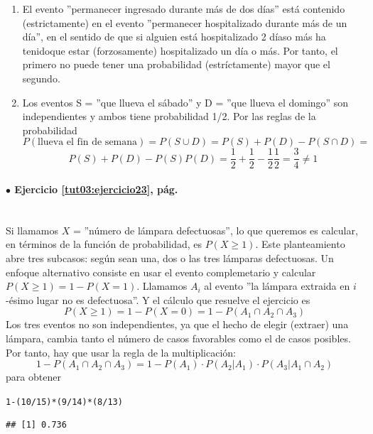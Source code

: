 \documentclass[10pt,a4paper]{article}\usepackage[]{graphicx}\usepackage[]{color}
\makeatletter
\newcommand{\hlnum}[1]{\textcolor[rgb]{0.686,0.059,0.569}{#1}}%
\newcommand{\hlopt}[1]{\textcolor[rgb]{0,0,0}{#1}}%
\newcommand{\hlstd}[1]{\textcolor[rgb]{0.345,0.345,0.345}{#1}}%
\newenvironment{kframe}{%
 \def\at@end@of@kframe{}%
 \ifinner\ifhmode%
  \def\at@end@of@kframe{\end{minipage}}%
  \begin{minipage}{\columnwidth}%
 \fi\fi%
 \def\FrameCommand##1{\hskip\@totalleftmargin \hskip-\fboxsep
 \colorbox{shadecolor}{##1}\hskip-\fboxsep
     \hskip-\linewidth \hskip-\@totalleftmargin \hskip\columnwidth}%
 \MakeFramed {\advance\hsize-\width
   \@totalleftmargin\z@ \linewidth\hsize
   \@setminipage}}%
 {\par\unskip\endMakeFramed%
 \at@end@of@kframe}
\newenvironment{knitrout}{}{} %
\newcounter {cont01}
\makeatother
\begin{document}
\begin{enumerate}
\item El evento ''permanecer ingresado durante m\'as de dos d\'ias'' está contenido (estrictamente) en el evento ''permanecer  hospitalizado durante m\'as de un d\'ia'', en el sentido de que si alguien está hospitalizado 2 díaso más ha tenidoque estar (forzosamente) hospitalizado un día o más. Por tanto, el primero no puede tener una probabilidad (estríctamente) mayor que el segundo.
\item Los eventos S = ''que llueva el sábado'' y  D = ''que llueva el domingo'' son independientes y ambos tiene probabilidad 1/2. 
Por las reglas de la probabilidad 
$$P(\text{llueva el fin de semana})=P(S\cup D) =P(S)+P( D)-P(S\cap D) =$$ 
$$ P(S)+P( D)-P(S)P(D) = \frac{1}{2}+\frac{1}{2}-\frac{1}{2}\frac{1}{2}=\frac{3}{4}\neq 1$$
\end{enumerate}


\paragraph{\bf $\bullet$ Ejercicio \ref{tut03:ejercicio23}, pág. \pageref{tut03:ejercicio23}}
\label{tut03:ejercicio23:sol}\quad\\
Si llamamos $X$ = ''número de lámpara defectuosas'', lo que queremos es calcular, en términos de la función de probabilidad, es $P(X\geq 1)$. Este planteamiento abre tres subcasos: según sean  una, dos o las tres lámparas defectuosas. Un enfoque alternativo consiste en usar el evento complemetario 
y calcular $P(X\geq 1)=1-P(X=1)$. Llamamos $A_i$ al evento ''la lámpara extraida en $i$-ésimo lugar no es defectuosa''. Y el cálculo que resuelve el ejercicio es 
$$P(X\geq 1)=1-P(X=0)=1-P(A_1\cap A_2\cap A_3)$$
Los tres eventos no son independientes, ya que el hecho de elegir (extraer) una lámpara, cambia tanto el número de casos favorables como el de casos posibles. Por tanto, hay que usar la regla de la multiplicación:
$$1-P(A_1\cap A_2\cap A_3)=1-P(A_1)·P(A_2| A_1)·P(A_3|A_1\cap A_2)$$
para obtener
\begin{knitrout}
\color{fgcolor}\begin{kframe}
\begin{alltt}
\hlnum{1}\hlopt{-}\hlstd{(}\hlnum{10}\hlopt{/}\hlnum{15}\hlstd{)}\hlopt{*}\hlstd{(}\hlnum{9}\hlopt{/}\hlnum{14}\hlstd{)}\hlopt{*}\hlstd{(}\hlnum{8}\hlopt{/}\hlnum{13}\hlstd{)}
\end{alltt}
\begin{verbatim}
## [1] 0.736
\end{verbatim}
\end{kframe}
\end{knitrout}
\end{document}
